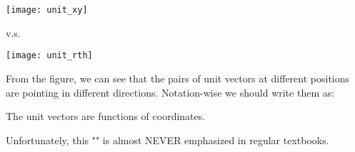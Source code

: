 \documentclass[class=article, crop=false, 12pt]{standalone}
\begin{document}
\begin{center}
    \begin{minipage}{0.3\linewidth}
        \centering
        \texttt{[image: unit\_xy]}
    \end{minipage}
    \hspace{0.05\textwidth}
    v.s.
    \hspace{0.05\textwidth}
    \begin{minipage}{0.3\linewidth}
        \centering
        \texttt{[image: unit\_rth]}
    \end{minipage}
\end{center}


From the figure, we can see that the pairs of unit vectors at different positions are pointing in different directions. 
Notation-wise we should write them as:

\begin{center}
    \begin{minipage}{0.55\textwidth}
        \begin{framed}
            \centering
            The unit vectors are functions of coordinates. 
        \end{framed}
    \end{minipage}
\end{center}

Unfortunately, this "" is almost NEVER emphasized in regular textbooks.
\end{document}
